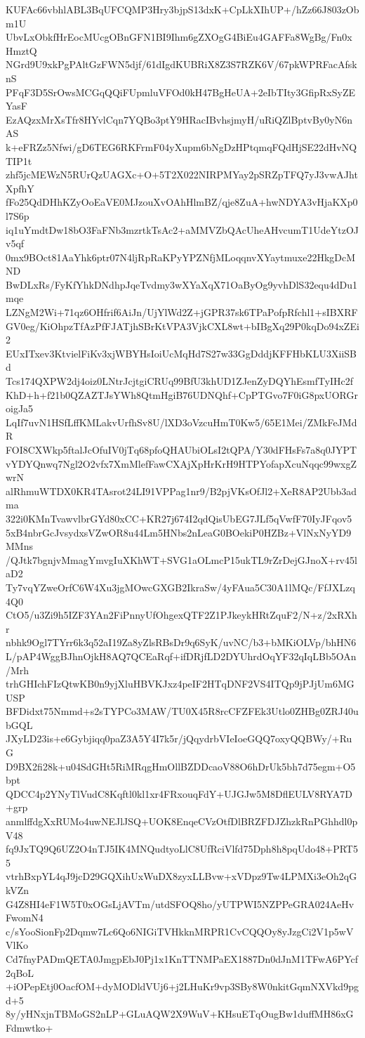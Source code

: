 KUFAc66vbhlABL3BqUFCQMP3Hry3bjpS13dxK+CpLkXIhUP+/hZz66J803zObm1U
UbvLxObkfHrEocMUcgOBnGFN1BI9Ihm6gZXOgG4BiEu4GAFFa8WgBg/Fn0xHmztQ
NGrd9U9xkPgPAltGzFWN5djf/61dIgdKUBRiX8Z3S7RZK6V/67pkWPRFacAfsknS
PFqF3D5SrOwsMCGqQQiFUpmluVFOd0kH47BgHeUA+2eIbTIty3GfipRxSyZEYasF
EzAQzxMrXsTfr8HYvlCqn7YQBo3ptY9HRacIBvhsjmyH/uRiQZlBptvBy0yN6nAS
k+eFRZz5Nfwi/gD6TEG6RKFrmF04yXupm6bNgDzHPtqmqFQdHjSE22dHvNQTIP1t
zhf5jcMEWzN5RUrQzUAGXc+O+5T2X022NIRPMYay2pSRZpTFQ7yJ3vwAJhtXpfhY
fFo25QdDHhKZyOoEaVE0MJzouXvOAhHlmBZ/qje8ZuA+hwNDYA3vHjaKXp0l7S6p
iq1uYmdtDw18bO3FaFNb3mzrtkTsAc2+aMMVZbQAcUheAHvcumT1UdeYtzOJv5qf
0mx9BOct81AaYhk6ptr07N4ljRpRaKPyYPZNfjMLoqqnvXYaytmuxe22HkgDcMND
BwDLxRs/FyKfYhkDNdhpJqeTvdmy3wXYaXqX71OaByOg9yvhDlS32equ4dDu1mqe
LZNgM2Wi+71qz6OHfrif6AiJn/UjYlWd2Z+jGPR37sk6TPaPofpRfchl1+sIBXRF
GV0eg/KiOhpzTfAzPfFJATjhSBrKtVPA3VjkCXL8wt+bIBgXq29P0kqDo94xZEi2
EUxITxev3KtvielFiKv3xjWBYHsIoiUcMqHd7S27w33GgDddjKFFHbKLU3XiiSBd
Tcs174QXPW2dj4oiz0LNtrJcjtgiCRUq99BfU3khUD1ZJenZyDQYhEsmfTyIHc2f
KhD+h+f21b0QZAZTJsYWh8QtmHgiB76UDNQhf+CpPTGvo7F0iG8pxUORGroigJa5
LqIf7uvN1HSfLffKMLakvUrfhSv8U/lXD3oVzcuHmT0Kw5/65E1Mei/ZMkFeJMdR
FOI8CXWkp5ftalJcOfuIV0jTq68pfoQHAUbiOLsI2tQPA/Y30dFHsFs7a8q0JYPT
vYDYQnwq7Ngl2O2vfx7XmMlefFawCXAjXpHrKrH9HTPYofapXcuNqqc99wxgZwrN
alRhmuWTDX0KR4TAsrot24LI91VPPag1nr9/B2pjVKsOfJl2+XeR8AP2Ubb3adma
322i0KMnTvawvlbrGYd80xCC+KR27j674I2qdQisUbEG7JLf5qVwfF70IyJFqov5
5xB4nbrGcJvsydxsVZwOR8u44Lm5HNbs2nLeaG0BOekiP0HZBz+VlNxNyYD9MMns
/QJtk7bgnjvMmagYmvgIuXKhWT+SVG1aOLmcP15ukTL9rZrDejGJnoX+rv45laD2
Ty7vqYZweOrfC6W4Xu3jgMOwcGXGB2IkraSw/4yFAua5C30A1lMQc/FfJXLzq4Q0
CtO5/u3Zi9h5IZF3YAn2FiPnnyUfOhgexQTF2Z1PJkeykHRtZquF2/N+z/2xRXhr
nbhk9Ogl7TYrr6k3q52aI19Za8yZlsRBsDr9q6SyK/uvNC/b3+bMKiOLVp/bhHN6
L/pAP4WggBJhnOjkH8AQ7QCEaRqf+ifDRjfLD2DYUhrdOqYF32qIqLBb5OAn/Mrh
trhGHIchFIzQtwKB0n9yjXluHBVKJxz4peIF2HTqDNF2VS4ITQp9jPJjUm6MGUSP
BFDidxt75Nmmd+s2sTYPCo3MAW/TU0X45R8rcCFZFEk3Utlo0ZHBg0ZRJ40ubGQL
JXyLD23is+e6Gybjiqq0paZ3A5Y4I7k5r/jQqydrbVIeIoeGQQ7oxyQQBWy/+RuG
D9BX2fi28k+u04SdGHt5RiMRqgHmOllBZDDcaoV88O6hDrUk5bh7d75egm+O5bpt
QDCC4p2YNyTlVudC8Kqftl0kl1xr4FRxouqFdY+UJGJw5M8DflEULV8RYA7D+grp
anmlffdgXxRUMo4uwNEJlJSQ+UOK8EnqeCVzOtfDlBRZFDJZhzkRnPGhhdl0pV48
fq9JxTQ9Q6UZ2O4nTJ5IK4MNQudtyoLlC8UfRciVlfd75Dph8h8pqUdo48+PRT55
vtrhBxpYL4qJ9jcD29GQXihUxWuDX8zyxLLBvw+xVDpz9Tw4LPMXi3eOh2qGkVZn
G4Z8HI4eF1W5T0xOGsLjAVTm/utdSFOQ8ho/yUTPWI5NZPPeGRA024AeHvFwomN4
c/sYooSionFp2Dqmw7Lc6Qo6NIGiTVHkknMRPR1CvCQQOy8yJzgCi2V1p5wVVlKo
Cd7fnyPADmQETA0JmgpEbJ0Pj1x1KnTTNMPaEX1887Dn0dJnM1TFwA6PYcf2qBoL
+iOPepEtj0OacfOM+dyMODldVUj6+j2LHuKr9vp3SBy8W0nkitGqmNXVkd9pgd+5
8y/yHNxjnTBMoGS2nLP+GLuAQW2X9WuV+KHsuETqOugBw1duffMH86xGFdmwtko+
